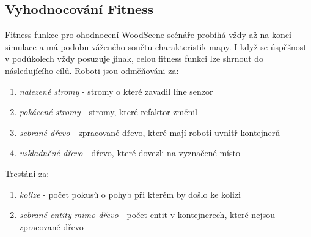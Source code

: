 \subsection*{Vyhodnocování Fitness}
Fitness funkce pro ohodnocení WoodScene scénáře probíhá vždy až na konci simulace a má podobu váženého součtu charakteristik mapy. I když se úspěšnost v podúkolech vždy posuzuje jinak, celou fitness funkci lze shrnout do následujícího cílů. Roboti jsou odměňováni za: 
\begin{enumerate}
        \item \textit{nalezené stromy} - stromy o které zavadil line senzor 
        \item \textit{pokácené stromy} - stromy, které refaktor změnil 
        \item \textit{sebrané dřevo} - zpracované dřevo, které mají roboti uvnitř kontejnerů 
        \item \textit{uskladněné dřevo} - dřevo, které dovezli na vyznačené místo 
\end{enumerate}
Trestáni za:
\begin{enumerate}
	\item \textit{kolize} - počet pokusů o pohyb při kterém by došlo ke kolizi 
	\item \textit{sebrané entity mimo dřevo} - počet entit v kontejnerech, které nejsou zpracované dřevo 
\end{enumerate}

